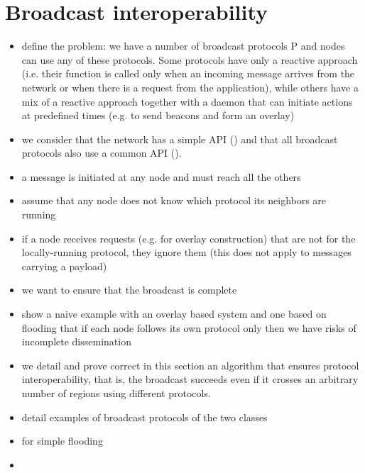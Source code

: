 
\section{Broadcast interoperability}




\begin{itemize}
	\item define the problem: we have a number of broadcast protocols P and nodes can use any of these protocols. Some protocols have only a reactive approach (i.e. their function is called only when an incoming message arrives from the network or when there is a request from the application), while others have a mix of a reactive approach together with a daemon that can initiate actions at predefined times (e.g. to send beacons and form an overlay)
	\item we consider that the network has a simple API () and that all broadcast protocols also use a common API ().
	\item a message is initiated at any node and must reach all the others
	\item assume that any node does not know which protocol its neighbors are running
	\item if a node receives requests (e.g. for overlay construction) that are not for the locally-running protocol, they ignore them (this does not apply to messages carrying a payload)
	\item we want to ensure that the broadcast is complete
	\item show a naive example with an overlay based system and one based on flooding that if each node follows its own protocol only then we have risks of incomplete dissemination
	\item we detail and prove correct in this section an algorithm that ensures protocol interoperability, that is, the broadcast succeeds even if it crosses an arbitrary number of regions using different protocols.
\end{itemize}

\begin{itemize}
	\item detail examples of broadcast protocols of the two classes
	\item {} for simple flooding
	\item {}
\end{itemize}

